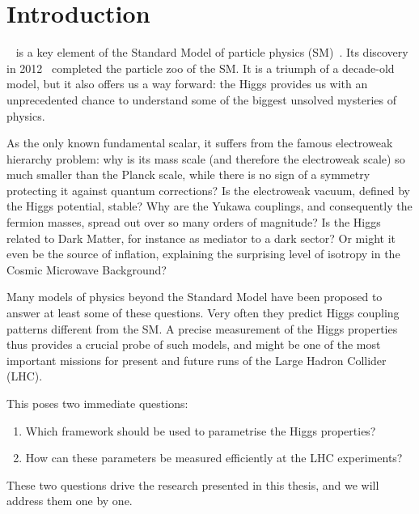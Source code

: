 

\chapter{Introduction}
\label{chapter:Introduction}

~\cite{Higgs:1964ia, Higgs:1964pj,
  Englert:1964et} is a key element of the Standard Model of particle
physics (SM)~\cite{Glashow:1961tr, Weinberg:1967tq, Salam:1968rm}. Its
discovery in 2012~\cite{Aad:2012tfa, Chatrchyan:2012xdj} completed the
particle zoo of the SM. It is a triumph of a decade-old model, but it
also offers us a way forward: the Higgs provides us with an
unprecedented chance to understand some of the biggest unsolved
mysteries of physics.

As the only known fundamental scalar, it suffers from the famous
electroweak hierarchy problem: why is its mass scale (and therefore
the electroweak scale) so much smaller than the Planck scale, while
there is no sign of a symmetry protecting it against quantum
corrections? Is the electroweak vacuum, defined by the Higgs
potential, stable?  Why are the Yukawa couplings, and consequently the
fermion masses, spread out over so many orders of magnitude?  Is the
Higgs related to Dark Matter, for instance as mediator to a dark
sector? Or might it even be the source of inflation, explaining the
surprising level of isotropy in the Cosmic Microwave Background?

Many models of physics beyond the Standard Model have been proposed to
answer at least some of these questions. Very often they predict Higgs
coupling patterns different from the SM. A precise measurement of the
Higgs properties thus provides a crucial probe of such models, and
might be one of the most important missions for present and future
runs of the Large Hadron Collider (LHC).

This poses two immediate questions:
%
\begin{enumerate}
\item Which framework should be used to parametrise the Higgs
  properties?
\item How can these parameters be measured efficiently at the LHC
  experiments?
\end{enumerate}
%
These two questions drive the research presented in this thesis, and
we will address them one by one.

